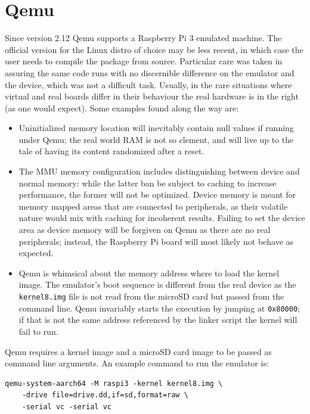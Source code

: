 \documentclass[12pt,a4paper,openright,twoside]{report}
\begin{document}
\section{Qemu}
Since version 2.12 Qemu supports a Raspberry Pi 3 emulated machine.
The official version for the Linux distro of choice may be less recent, in 
which case the user needs to compile the package from source.
 Particular care was taken in assuring the same code runs with no discernible difference on
the emulator and the device, which was not a difficult task.
Usually, in the rare situations where virtual and real boards differ in their
behaviour the real hardware is in the right (as one would expect).
Some examples found along the way are:
\begin{itemize}
    \item Uninitialized memory location will inevitably contain null values if 
        running under Qemu; the real world RAM is not so clement, and will live 
        up to the tale of having its content randomized after a reset.
    \item The MMU memory configuration includes distinguishing between device
        and normal memory: while the latter ban be subject to caching to increase performance,
        the former will not be optimized. Device memory is meant for memory mapped
        areas that are connected to peripherals, as their volatile nature would
        mix with caching for incoherent results.
        Failing to set the device area as device memory will be forgiven on Qemu
        as there are no real peripherals; instead, the Raspberry Pi board will most likely
        not behave as expected.
    \item Qemu is whimsical about the memory address where to load the kernel image.
        The emulator's boot sequence is different from the real device as the
        {\tt kernel8.img} file is not read from the microSD card but passed from
        the command line. Qemu invariably starts the execution by jumping at 
        {\tt 0x80000}; if that is not the same address referenced by the linker
        script the kernel will fail to run.
\end{itemize}

Qemu requires a kernel image and a microSD card image to be passed as command
line arguments. An example command to run the emulator is:
\begin{lstlisting}
qemu-system-aarch64 -M raspi3 -kernel kernel8.img \
    -drive file=drive.dd,if=sd,format=raw \
    -serial vc -serial vc
\end{lstlisting}
\end{document}
